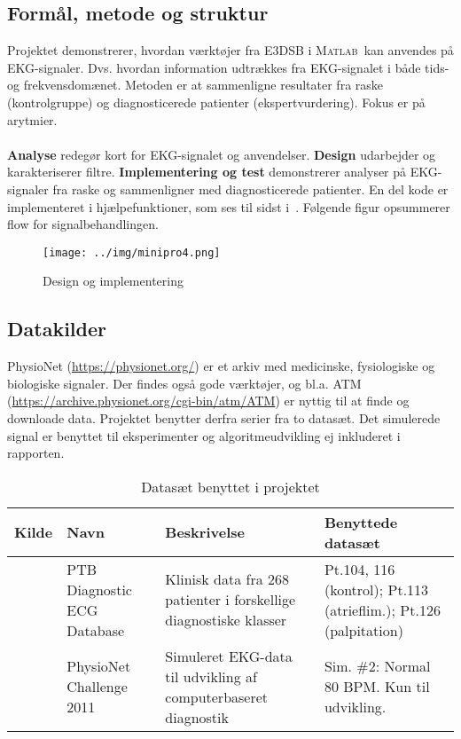 \documentclass[a4paper]{report}
\newcommand{\MATLAB}{\textsc{Matlab}}
\begin{document}
\begin{par}

\section{Formål, metode og struktur}
Projektet demonstrerer, hvordan værktøjer fra E3DSB i \MATLAB~kan anvendes på EKG-signaler.
Dvs. hvordan information udtrækkes fra EKG-signalet i både tids- og frekvensdomænet.
Metoden er at sammenligne resultater fra raske (kontrolgruppe) og diagnosticerede patienter (ekspertvurdering).
Fokus er på arytmier.
\\ \\
\textbf{Analyse} redegør kort for EKG-signalet og anvendelser.
\textbf{Design} udarbejder og karakteriserer filtre.
\textbf{Implementering og test} demonstrerer analyser på EKG-signaler fra raske og sammenligner med diagnosticerede patienter.
En del kode er implementeret i hjælpefunktioner, som ses til sidst i~\textbf{}.
Følgende figur opsummerer flow for signalbehandlingen.
\begin{figure}[H]
\centering
\texttt{[image: ../img/minipro4.png]}
\caption{Design og implementering\label{fig:design}}
\end{figure}

\end{par} 
\begin{par}

\section{Datakilder}
PhysioNet (\url{https://physionet.org/}) er et arkiv med medicinske, fysiologiske og biologiske signaler.
Der findes også gode værktøjer, og bl.a. ATM (\url{https://archive.physionet.org/cgi-bin/atm/ATM}) er nyttig til at finde og downloade data.
Projektet benytter derfra serier fra to datasæt.
Det simulerede signal er benyttet til eksperimenter og algoritmeudvikling ej inkluderet i rapporten.

\end{par} 
\begin{par}

\begin{table}[H]
\centering
\begin{tabular}{|p{1cm}|p{3cm}|p{6cm}|p{5cm}|} \hline
Kilde & Navn & Beskrivelse & Benyttede datasæt \\ \hline
\cite{ptb}
 & PTB Diagnostic ECG Database
 & Klinisk data fra 268 patienter i forskellige diagnostiske klasser
 & Pt.104, 116 (kontrol); Pt.113 (atrieflim.); Pt.126 (palpitation) \\ \hline
\cite{challenge2011}
 & PhysioNet Challenge 2011
 & Simuleret EKG-data til udvikling af computerbaseret diagnostik
 & Sim. \#2: Normal 80 BPM. Kun til udvikling. \\ \hline
\end{tabular}\caption{Datasæt benyttet i projektet}
\label{tab:datasets}
\end{table}

\end{par} 
\end{document}
